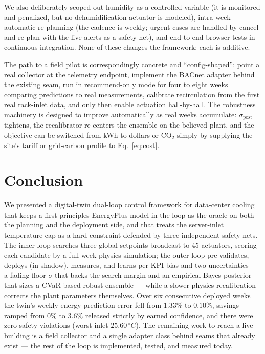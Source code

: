 \documentclass[11pt]{article}
\newcommand{\degC}{\ensuremath{^{\circ}}C}
\newcommand{\sigpost}{\sigma_{\mathrm{post}}}
\begin{document}
We also deliberately scoped out humidity as a controlled variable (it is monitored and
penalized, but no dehumidification actuator is modeled), intra-week automatic re-planning
(the cadence is weekly; urgent cases are handled by cancel-and-re-plan with the live alerts
as a safety net), and end-to-end browser tests in continuous integration. None of these
changes the framework; each is additive.

The path to a field pilot is correspondingly concrete and ``config-shaped'': point a real
collector at the telemetry endpoint, implement the BACnet adapter behind the existing seam,
run in recommend-only mode for four to eight weeks comparing predictions to real
measurements, calibrate recirculation from the first real rack-inlet data, and only then
enable actuation hall-by-hall. The robustness machinery is designed to improve automatically
as real weeks accumulate: \(\sigpost\) tightens, the recalibrator re-centers the ensemble on
the believed plant, and the objective can be switched from kWh to dollars or
\(\mathrm{CO_2}\) simply by supplying the site's tariff or grid-carbon profile to
Eq.~\eqref{eq:cost}.

\section{Conclusion}
\label{sec:conclusion}

We presented a digital-twin dual-loop control framework for data-center cooling that keeps a
first-principles EnergyPlus model in the loop as the oracle on both the planning and the
deployment side, and that treats the server-inlet temperature cap as a hard constraint
defended by three independent safety nets. The inner loop searches three global setpoints
broadcast to 45 actuators, scoring each candidate by a full-week physics simulation; the
outer loop pre-validates, deploys (in shadow), measures, and learns per-KPI bias and two
uncertainties --- a fading-floor \(\sigma\) that backs the search margin and an
empirical-Bayes posterior that sizes a CVaR-based robust ensemble --- while a slower physics
recalibration corrects the plant parameters themselves. Over six consecutive deployed weeks
the twin's weekly-energy prediction error fell from \(1.33\%\) to \(0.10\%\), savings ramped
from \(0\%\) to \(3.6\%\) released strictly by earned confidence, and there were zero safety
violations (worst inlet \(25.60\,\degC\)). The remaining work to reach a live building is a
field collector and a single adapter class behind seams that already exist --- the rest of the
loop is implemented, tested, and measured today.
\end{document}
